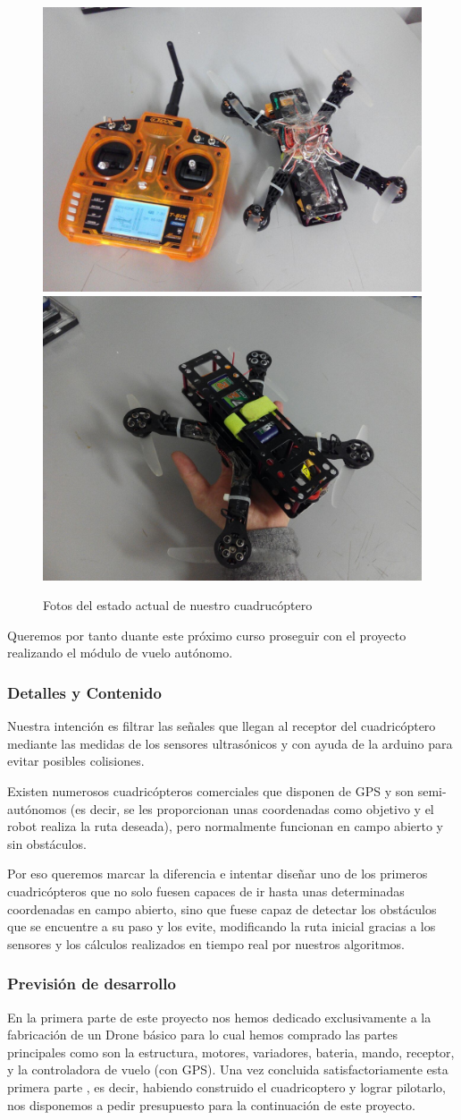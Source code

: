 \documentclass[12pt,twoside]{report}
\begin{document}
\begin{figure}[hbtp]
\centerline{
    \includegraphics[width=0.45\linewidth]{fotos/dron1.jpg}
    \includegraphics[width=0.45\linewidth]{fotos/dron2.jpg}}
\caption*{
Fotos del estado actual de nuestro cuadrucóptero}
\end{figure}

Queremos por tanto duante este próximo curso proseguir con el proyecto realizando el módulo de vuelo autónomo.


\subsubsection{Detalles y Contenido}
Nuestra intención es filtrar las señales que llegan al receptor del cuadricóptero mediante las medidas de los sensores ultrasónicos y con ayuda de la arduino para evitar posibles colisiones.

Existen numerosos cuadricópteros comerciales que disponen de GPS y son semi-autónomos (es decir, se les proporcionan unas coordenadas como objetivo y el robot realiza la ruta deseada), pero normalmente funcionan en campo abierto y sin obstáculos.

Por eso queremos marcar la diferencia e intentar diseñar uno de los primeros cuadricópteros que no solo fuesen capaces de ir hasta unas determinadas coordenadas en campo abierto, sino que fuese capaz de detectar los obstáculos que se encuentre a su paso y los evite, modificando la ruta inicial gracias a los sensores y los cálculos realizados en tiempo real por nuestros algoritmos.


\subsubsection{Previsión de desarrollo}
En la primera parte de este proyecto nos hemos dedicado exclusivamente a la fabricación de un Drone básico para lo cual hemos comprado las partes principales como son la estructura, motores, variadores, bateria, mando, receptor, y la controladora de vuelo (con GPS). Una vez concluida satisfactoriamente esta primera parte , es decir, habiendo construido el cuadricoptero y lograr pilotarlo, nos disponemos a pedir presupuesto para la continuación de este proyecto.
\end{document}

